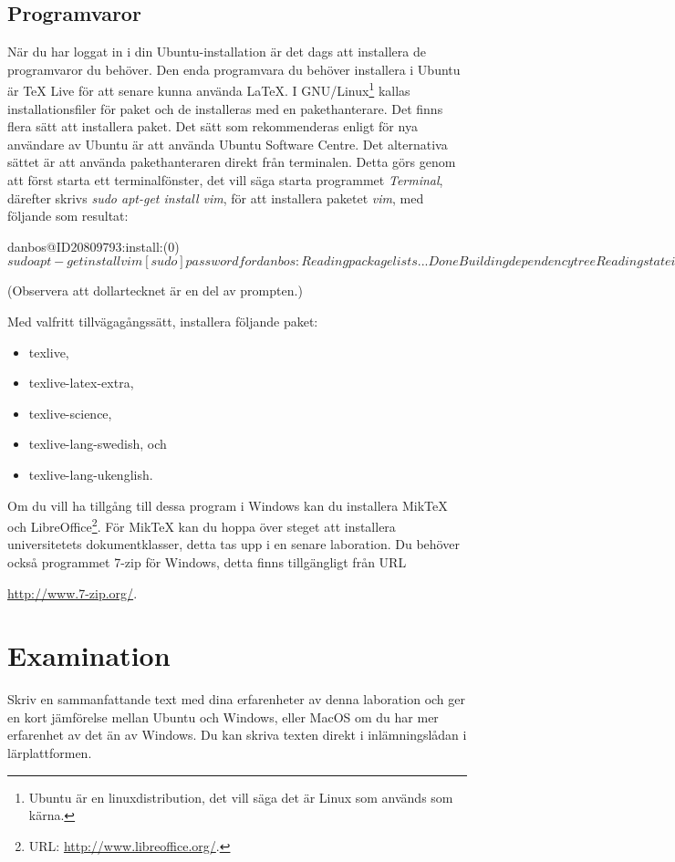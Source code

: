 \documentclass[a4paper]{miunasgn}
\begin{document}
\subsection{Programvaror}
\noindent
När du har loggat in i din Ubuntu-installation är det dags att installera de 
programvaror du behöver.
Den enda programvara du behöver installera i Ubuntu är TeX Live för att senare 
kunna använda \LaTeX.
I GNU/Linux\footnote{%
	Ubuntu är en linuxdistribution, det vill säga det är Linux som används som 
	kärna.
} kallas installationsfiler för paket och de installeras med en pakethanterare.
Det finns flera sätt att installera paket.
Det sätt som rekommenderas enligt \citet{UbuntuDesktop} för nya användare av 
Ubuntu är att använda Ubuntu Software Centre.
Det alternativa sättet är att använda pakethanteraren direkt från terminalen.
Detta görs genom att först starta ett terminalfönster, det vill säga starta 
programmet \emph{Terminal}, därefter skrivs \emph{sudo apt-get install vim}, 
för att installera paketet \emph{vim}, med följande som resultat:
\begin{terminal}
danbos@ID20809793:install:(0)$ sudo apt-get install vim
[sudo] password for danbos: 
Reading package lists... Done
Building dependency tree       
Reading state information... Done
vim is already the newest version.
The following package was automatically installed and is no longer required:
  john-data
Use 'apt-get autoremove' to remove them.
0 upgraded, 0 newly installed, 0 to remove and 59 not upgraded.
$
\end{terminal}
(Observera att dollartecknet är en del av prompten.)

Med valfritt tillvägagångssätt, installera följande paket:
\begin{itemize}
	\item texlive,
	\item texlive-latex-extra,
	\item texlive-science,
	\item texlive-lang-swedish, och
	\item texlive-lang-ukenglish.
\end{itemize}

Om du vill ha tillgång till dessa program i Windows kan du installera MikTeX 
\citep{Bosk2012lui} och LibreOffice\footnote{%
	URL: \url{http://www.libreoffice.org/}.
}.
För MikTeX kan du hoppa över steget att installera universitetets 
dokumentklasser, detta tas upp i en senare laboration.
Du behöver också programmet 7-zip för Windows, detta finns tillgängligt från 
URL
\begin{center}
	\url{http://www.7-zip.org/}.
\end{center}


\section{Examination}
\label{sec:Examination}
Skriv en sammanfattande text med dina erfarenheter av denna laboration och ger 
en kort jämförelse mellan Ubuntu och Windows, eller MacOS om du har mer 
erfarenhet av det än av Windows.
Du kan skriva texten direkt i inlämningslådan i lärplattformen.


\printbibliography
\end{document}
